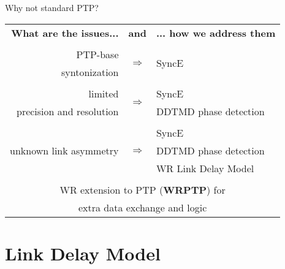 \documentclass[compress,red]{beamer}
\begin{document}
\begin{frame}{Why not standard PTP?}

  \resizebox{11cm}{!} 
  {
    \begin{tabular}{ r c l }
  {\bf What are the issues...} 	& {\bf and}      & {\bf ... how we address them}  \\
				&     		 &        \\
      PTP-base		 	& \multirow{2}{*}{$\Rightarrow$}  & \multirow{2}{*}{SyncE }\\
      syntonization	        &      		 &        \\
				&      		 &        			\\
      limited             	&\multirow{2}{*}{$\Rightarrow$}  	 & SyncE \\
      precision and resolution  &      		 & DDTMD phase detection\\
				&    		 &        \\
			        &      		 & SyncE  \\
      unknown link asymmetry    & $\Rightarrow$  & DDTMD phase detection \\
				&      		 & WR Link Delay Model \\
				&      		 &        \\
      \multicolumn{3}{c}{WR extension to PTP ({\bf WRPTP}) for } \\
      \multicolumn{3}{c}{extra data exchange and logic} \\
    \end{tabular}
  }
\end{frame}

\section{Link Delay Model}
\end{document}
